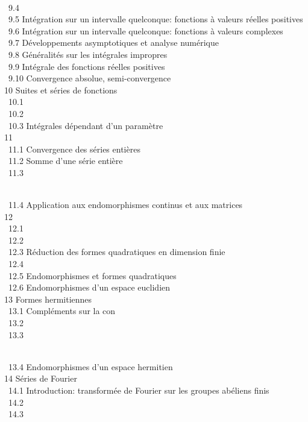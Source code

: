 \documentclass[]{article}
\begin{document}
 \\ ~9.4
 \\ ~9.5
{Intégration sur un intervalle
quelconque: fonctions à valeurs réelles positives} \\ ~9.6
{Intégration sur un intervalle
quelconque: fonctions à valeurs complexes} \\ ~9.7
{Développements asymptotiques et
analyse numérique} \\ ~9.8
{Généralités sur les intégrales
impropres} \\ ~9.9 {Intégrale des
fonctions réelles positives} \\ ~9.10
{Convergence absolue,
semi-convergence} \\ 10 {Suites et
séries de fonctions} \\ ~10.1
 \\ ~10.2
 \\ ~10.3
{Intégrales dépendant d'un
paramètre} \\ 11  \\
~11.1 {Convergence des séries
entières} \\ ~11.2 {Somme d'une
série entière} \\ ~11.3

\\ ~11.4 {Application aux
endomorphismes continus et aux matrices} \\ 12
 \\ ~12.1
 \\ ~12.2
 \\ ~12.3
{Réduction des formes quadratiques
en dimension finie} \\ ~12.4
 \\
~12.5 {Endomorphismes et formes
quadratiques} \\ ~12.6
{Endomorphismes d'un espace
euclidien} \\ 13 {Formes
hermitiennes} \\ ~13.1 {Compléments
sur la con\jmathugaison} \\ ~13.2
 \\ ~13.3

\\ ~13.4 {Endomorphismes d'un
espace hermitien} \\ 14 {Séries de
Fourier} \\ ~14.1 {Introduction:
transformée de Fourier sur les groupes abéliens finis} \\ ~14.2
 \\ ~14.3
\end{document}
